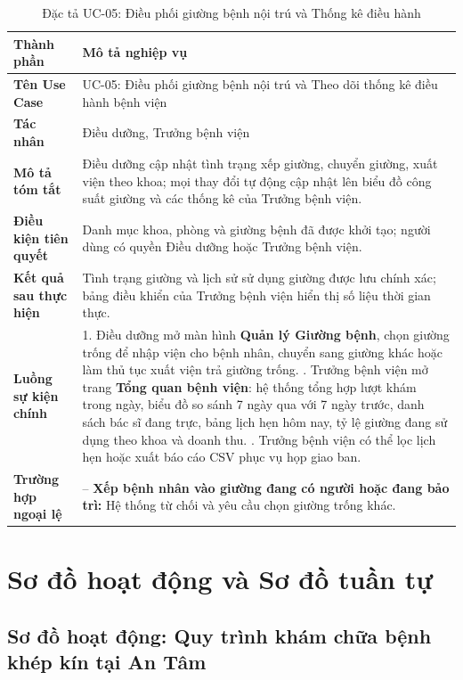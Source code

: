 \documentclass[12pt,a4paper]{report}
\begin{document}
\begin{table}[H]
  \centering
  \caption{Đặc tả UC-05: Điều phối giường bệnh nội trú và Thống kê điều hành}
  \begin{tabularx}{\textwidth}{@{}l X@{}}
    \toprule
    \textbf{Thành phần} & \textbf{Mô tả nghiệp vụ} \\
    \midrule
    \textbf{Tên Use Case} & UC-05: Điều phối giường bệnh nội trú và Theo dõi thống kê điều hành bệnh viện \\
    \textbf{Tác nhân} & Điều dưỡng, Trưởng bệnh viện \\
    \textbf{Mô tả tóm tắt} & Điều dưỡng cập nhật tình trạng xếp giường, chuyển giường, xuất viện theo khoa; mọi thay đổi tự động cập nhật lên biểu đồ công suất giường và các thống kê của Trưởng bệnh viện. \\
    \textbf{Điều kiện tiên quyết} & Danh mục khoa, phòng và giường bệnh đã được khởi tạo; người dùng có quyền Điều dưỡng hoặc Trưởng bệnh viện. \\
    \textbf{Kết quả sau thực hiện} & Tình trạng giường và lịch sử sử dụng giường được lưu chính xác; bảng điều khiển của Trưởng bệnh viện hiển thị số liệu thời gian thực. \\
    \textbf{Luồng sự kiện chính} &
      1. Điều dưỡng mở màn hình \textbf{Quản lý Giường bệnh}, chọn giường trống để nhập viện cho bệnh nhân, chuyển sang giường khác hoặc làm thủ tục xuất viện trả giường trống. \newline
      2. Trưởng bệnh viện mở trang \textbf{Tổng quan bệnh viện}: hệ thống tổng hợp lượt khám trong ngày, biểu đồ so sánh 7 ngày qua với 7 ngày trước, danh sách bác sĩ đang trực, bảng lịch hẹn hôm nay, tỷ lệ giường đang sử dụng theo khoa và doanh thu. \newline
      3. Trưởng bệnh viện có thể lọc lịch hẹn hoặc xuất báo cáo CSV phục vụ họp giao ban. \\
    \textbf{Trường hợp ngoại lệ} &
      -- \textbf{Xếp bệnh nhân vào giường đang có người hoặc đang bảo trì:} Hệ thống từ chối và yêu cầu chọn giường trống khác. \\
    \bottomrule
  \end{tabularx}
\end{table}

\section{Sơ đồ hoạt động và Sơ đồ tuần tự}

\subsection{Sơ đồ hoạt động: Quy trình khám chữa bệnh khép kín tại An Tâm}
\end{document}
